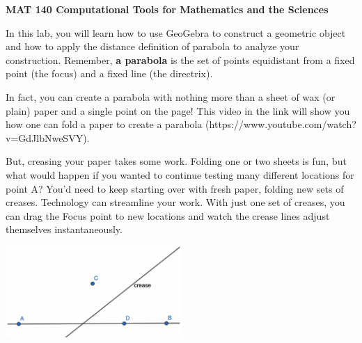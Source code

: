 \documentclass[11pt]{article}
\begin{document}
\begin{center}
{\bf MAT 140 \quad Computational Tools for Mathematics and the Sciences}

\end{center}

\medskip
{}

\smallskip


\smallskip


\smallskip



\vspace{0.2 in}



\smallskip

\noindent In this lab, you will learn how to use GeoGebra to construct a geometric object and how to apply the distance definition of parabola to analyze your construction. Remember, \textbf{a parabola} is the set of points equidistant from a fixed point (the focus) and a fixed line (the directrix). 
\vspace{0.2 in}

In fact, you can create a parabola with nothing more than a sheet of wax (or plain) paper and a single point on the page! This video in the link will show you how one can fold a paper to create a parabola (https://www.youtube.com/watch?v=GdJlbNweSVY). %
\vspace{0.2 in}

But, creasing your paper takes some work. Folding one or two sheets is fun, but what would happen if you wanted to continue testing many different locations for point A? You’d need to keep starting over with fresh paper, folding new sets of creases. Technology can streamline your work. With just one set of creases, you can drag the Focus point to new locations and watch the crease lines adjust themselves instantaneously.


\vspace{0.2 in}





\begin{center}
\includegraphics[width=0.5\textwidth]{figure1.png}
\end{center}
\end{document}
